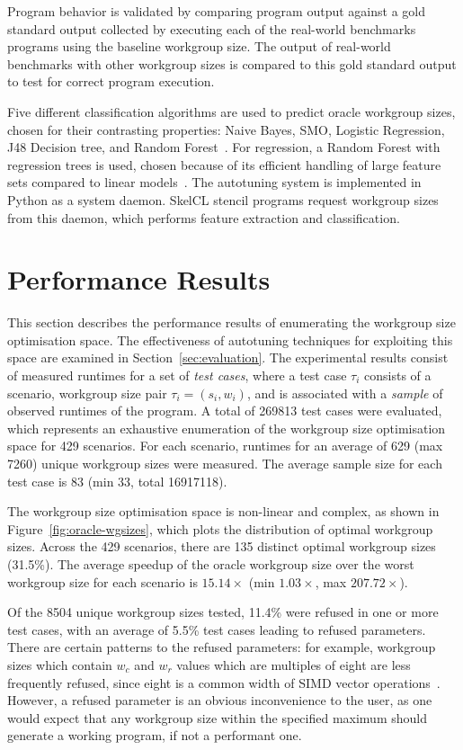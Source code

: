 \documentclass[preprint,nonatbib,10pt]{sigplanconf}
\begin{document}
Program behavior is validated by comparing program output against a
gold standard output collected by executing each of the real-world
benchmarks programs using the baseline workgroup size. The output of
real-world benchmarks with other workgroup sizes is compared to this
gold standard output to test for correct program execution.

Five different classification algorithms are used to predict oracle
workgroup sizes, chosen for their contrasting properties: Naive Bayes,
SMO, Logistic Regression, J48 Decision tree, and Random
Forest~\cite{Han2011}. For regression, a Random Forest with regression
trees is used, chosen because of its efficient handling of large
feature sets compared to linear models~\cite{Breiman1999}. The
autotuning system is implemented in Python as a system daemon. SkelCL
stencil programs request workgroup sizes from this daemon, which
performs feature extraction and classification.


\section{Performance Results}\label{sec:results}

This section describes the performance results of enumerating the
workgroup size optimisation space. The effectiveness of autotuning
techniques for exploiting this space are examined in
Section~\ref{sec:evaluation}. The experimental results consist of
measured runtimes for a set of \emph{test cases}, where a test case
$\tau_i$ consists of a scenario, workgroup size pair
$\tau_i = (s_i,w_i)$, and is associated with a \emph{sample} of
observed runtimes of the program. A total of 269813 test cases were
evaluated, which represents an exhaustive enumeration of the workgroup
size optimisation space for 429 scenarios. For each scenario, runtimes
for an average of 629 (max 7260) unique workgroup sizes were
measured. The average sample size for each test case is 83 (min 33,
total 16917118).

The workgroup size optimisation space is non-linear and complex, as
shown in Figure~\ref{fig:oracle-wgsizes}, which plots the distribution
of optimal workgroup sizes. Across the 429 scenarios, there are 135
distinct optimal workgroup sizes (31.5\%). The average speedup of the
oracle workgroup size over the worst workgroup size for each scenario
is $15.14\times$ (min $1.03\times$, max $207.72\times$).

Of the 8504 unique workgroup sizes tested, 11.4\% were refused in one
or more test cases, with an average of 5.5\% test cases leading to
refused parameters. There are certain patterns to the refused
parameters: for example, workgroup sizes which contain $w_c$ and $w_r$
values which are multiples of eight are less frequently refused, since
eight is a common width of SIMD vector
operations~\cite{IntelCorporation2012}. However, a refused parameter
is an obvious inconvenience to the user, as one would expect that any
workgroup size within the specified maximum should generate a working
program, if not a performant one.
\end{document}
